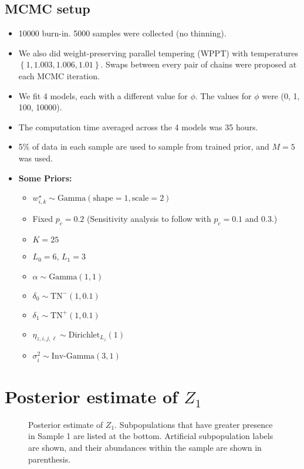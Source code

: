 \documentclass[11pt]{article} %
\newcommand{\bc}[1]{ \left\{#1\right\} }
\newcommand{\Gam}{ \text{Gamma} }
\newcommand{\InvGamma}{ \text{Inv-Gamma} }
\def\Dir{\text{Dirichlet}}
\def\TN{\text{TN}}
\def\imscale{.5}
\begin{document}
\subsection{MCMC setup}
\begin{itemize}
  \item 10000 burn-in. 5000 samples were collected (no thinning).
  \item We also did weight-preserving parallel tempering (WPPT) with temperatures 
        $\bc{1, 1.003, 1.006, 1.01}$. Swaps between every pair of chains were
        proposed at each MCMC iteration.
  \item We fit 4 models, each with a different value for $\phi$. The values
        for $\phi$ were (0, 1, 100, 10000).
  \item The computation time averaged across the 4 models was 35 hours.
  \item 5\% of data in each sample are used to sample from trained prior, and
    $M=5$ was used.
  \item \textbf{Some Priors:}
  \begin{itemize}
    \item $w^\star_{i,k} \sim \Gam(\text{shape}=1, \text{scale}=2)$
    \item Fixed $p_c=0.2$ (Sensitivity analysis to follow with $p_c = 0.1$ and $0.3$.)
    \item $K=25$
    \item $L_0=6$, $L_1=3$
    \item $\alpha \sim \Gam(1, 1)$
    \item $\delta_0 \sim \TN^-(1, 0.1)$
    \item $\delta_1 \sim \TN^+(1, 0.1)$
    \item $\eta_{z, i,j,\ell} \sim \Dir_{L_z}(1)$
    \item $\sigma^2_i \sim \InvGamma(3, 1)$
  \end{itemize}
\end{itemize}


\newpage
\section{Posterior estimate of $Z_1$}
\begin{figure}[H]
  \begin{center}  %
    \imgtemplate{Z1.pdf}{\imscale}
  \end{center}
  \caption{Posterior estimate of $Z_1$. Subpopulations that have greater
  presence in Sample 1 are listed at the bottom. Artificial subpopulation
  labels are shown, and their abundances within the sample are shown in
  parenthesis.}
  \label{fig:z1est}
\end{figure}
\end{document}
